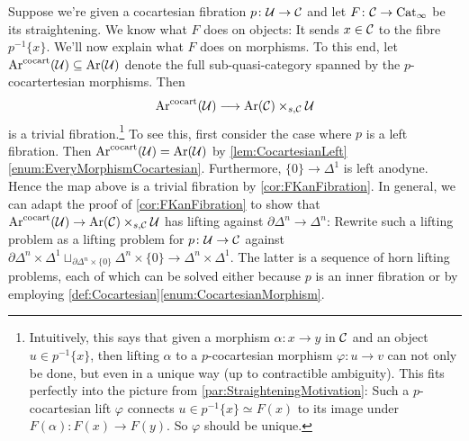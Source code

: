 \begin{numpar}\label{par:StraighteningOnMorphisms}
	Suppose we're given a cocartesian fibration $p\colon \mathcal{U}\rightarrow \mathcal{C}$ and let $F\colon \mathcal{C}\rightarrow \mathrm{Cat}_\infty$ be its straightening. We know what $F$ does on objects: It sends $x\in \mathcal{C}$ to the fibre $p^{-1}\{x\}$. We'll now explain what $F$ does on morphisms. To this end, let $\operatorname{Ar}^{\mathrm{cocart}}(\mathcal{U})\subseteq \operatorname{Ar}(\mathcal{U})$ denote the full sub-quasi-category spanned by the $p$-cocartertesian morphisms. Then 
	\begin{equation*}
		\operatorname{Ar}^{\mathrm{cocart}}(\mathcal{U})\longrightarrow \operatorname{Ar}(\mathcal{C})\times_{s,\mathcal{C}}\mathcal{U}
	\end{equation*}
	is a trivial fibration.\footnote{Intuitively, this says that given a morphism $\alpha\colon x\rightarrow y$ in $\mathcal{C}$ and an object $u\in p^{-1}\{x\}$, then lifting $\alpha$ to a $p$-cocartesian morphism $\varphi\colon u\rightarrow v$ can not only be done, but even in a unique way (up to contractible ambiguity). This fits perfectly into the picture from \cref{par:StraighteningMotivation}: Such a $p$-cocartesian lift $\varphi$ connects $u\in p^{-1}\{x\}\simeq F(x)$ to its image under $F(\alpha)\colon F(x)\rightarrow F(y)$. So $\varphi$ should be unique.} To see this, first consider the case where $p$ is a left fibration. Then $\operatorname{Ar}^{\mathrm{cocart}}(\mathcal{U})= \operatorname{Ar}(\mathcal{U})$ by \cref{lem:CocartesianLeft}\cref{enum:EveryMorphismCocartesian}. Furthermore, $\{0\}\rightarrow \Delta^1$ is left anodyne. Hence the map above is a trivial fibration by \cref{cor:FKanFibration}. In general, we can adapt the proof of \cref{cor:FKanFibration} to show that $\operatorname{Ar}^{\mathrm{cocart}}(\mathcal{U})\rightarrow \operatorname{Ar}(\mathcal{C})\times_{s,\mathcal{C}}\mathcal{U}$ has lifting against $\partial\Delta^n\rightarrow\Delta^n$: Rewrite such a lifting problem as a lifting problem for $p\colon \mathcal{U}\rightarrow \mathcal{C}$ against $\partial\Delta^n\times\Delta^1\sqcup_{\partial\Delta^n\times\{0\}}\Delta^n\times\{0\}\rightarrow \Delta^n\times\Delta^1$. The latter is a sequence of horn lifting problems, each of which can be solved either because $p$ is an inner fibration or by employing \cref{def:Cocartesian}\cref{enum:CocartesianMorphism}.%
	

\end{numpar}
